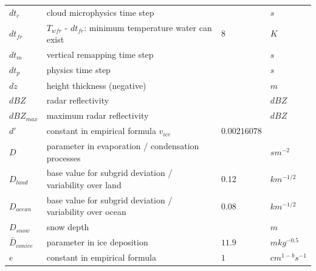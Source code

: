 \documentclass[letterpaper,titlepage,10pt]{article}
\numberwithin{equation}{section}
\begin{document}
\begin{appendices}
\begin{longtable}{p{}p{}p{}p{}}
	$dt_c$             & cloud microphysics time step                                                         &                            & $s$ \\
	$dt_{fr}$          & $T_{wfr}$ - $dt_{fr}$: minimum temperature water can exist                           & $8$                        & $K$ \\
	$dt_m$             & vertical remapping time step                                                         &                            & $s$ \\
	$dt_p$             & physics time step                                                                    &                            & $s$ \\
	$dz$               & height thickness (negative)                                                          &                            & $m$ \\
	$dBZ$              & radar reflectivity                                                                   &                            & $dBZ$ \\
	$dBZ_{max}$        & maximum radar reflectivity                                                           &                            & $dBZ$ \\
	$d'$               & constant in empirical formula $v_{ice}$                                              & $0.00216078$               & \\
	$D$                & parameter in evaporation / condensation processes                                    &                            & $s m^{-2}$ \\
	$D_{land}$         & base value for subgrid deviation / variability over land                             & $0.12$                     & $km^{-1/2}$ \\
	$D_{ocean}$        & base value for subgrid deviation / variability over ocean                            & $0.08$                     & $km^{-1/2}$ \\
	$D_{snow}$         & snow depth                                                                           &                            & $m$ \\
	$\bar{D}_{conice}$ & parameter in ice deposition                                                          & $11.9$                     & $m kg^{-0.5}$ \\
	$e$                & constant in empirical formula                                                        & $1$                        & $cm^{1-b} s^{-1}$ \\

\end{longtable}
\end{appendices}
\end{document}
